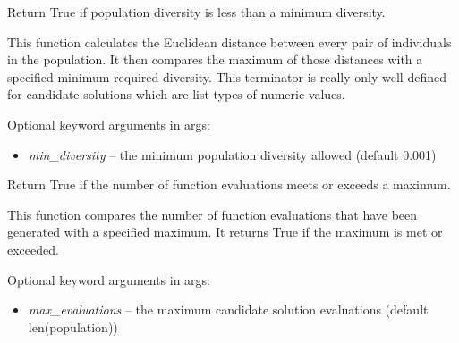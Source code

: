 \documentclass[letterpaper,10pt,english]{sphinxmanual}
\begin{document}
\begin{fulllineitems}
\label{reference:inspyred.ec.terminators.diversity_termination}
Return True if population diversity is less than a minimum diversity.

This function calculates the Euclidean distance between every pair of
individuals in the population. It then compares the maximum of those
distances with a specified minimum required diversity. This terminator 
is really only well-defined for candidate solutions which are list 
types of numeric values.

Optional keyword arguments in args:
\begin{itemize}
\item {} 
\emph{min\_diversity} -- the minimum population diversity allowed (default 0.001)

\end{itemize}

\end{fulllineitems}


\begin{fulllineitems}
\label{reference:inspyred.ec.terminators.evaluation_termination}
Return True if the number of function evaluations meets or exceeds a maximum.

This function compares the number of function evaluations that have been 
generated with a specified maximum. It returns True if the maximum is met
or exceeded.

Optional keyword arguments in args:
\begin{itemize}
\item {} 
\emph{max\_evaluations} -- the maximum candidate solution evaluations (default 
len(population))

\end{itemize}

\end{fulllineitems}

\end{document}
